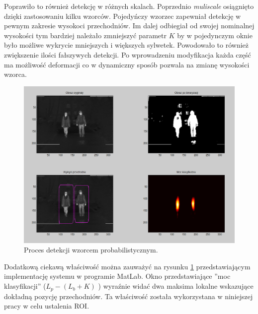Poprawiło to również detekcję w różnych skalach. Poprzednio \textit{muliscale} osiągnięto dzięki zastosowaniu kilku wzorców. Pojedyńczy wzorzec zapewniał detekcję w pewnym zakresie wysokoci przechodniów. Im dalej odbiegiał od swojej nominalnej wysokości tym bardziej należało zmniejszyć parametr $K$ by w pojedynczym oknie było możliwe wykrycie mniejszych i większych sylwetek. Powodowało to również zwiększenie ilości fałszywych detekcji. Po wprowadzeniu modyfikacja każda część ma możliwość deformacji co w dynamiczny sposób pozwala na zmianę wysokości wzorca.

\begin{figure}
\centering
\includegraphics[width=0.8\linewidth]{images/sim_window.png}
\caption[Proces detekcji wzorcem probabilistycznym.]{Proces detekcji wzorcem probabilistycznym. \cite{kankaing}}
\label{fig:sim_window}
\end{figure}

Dodatkową ciekawą właściwość można zauważyć na rysunku \ref{fig:sim_window} przedstawiającym implementację systemu w programie MatLab. Okno przedstawiające ''moc klasyfikacji'' ($L_p - (L_b + K)$ ) wyraźnie widać dwa maksima lokalne wskazujące dokładną pozycję przechodniów. Ta właściwość została wykorzystana w niniejszej pracy w celu ustalenia ROI.




